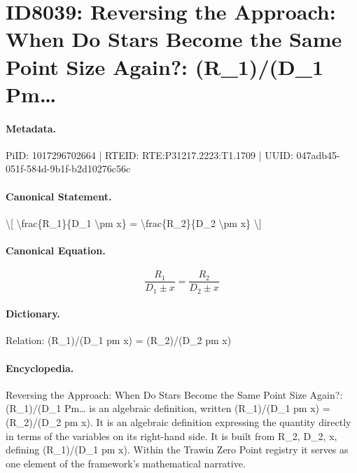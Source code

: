 \section*{ID8039: Reversing the Approach: When Do Stars Become the Same Point Size Again?: (R\_1)/(D\_1 Pm…}
\paragraph{Metadata.}
PiID: 1017296702664 | RTEID: RTE:P31217.2223:T1.1709 | UUID: 047adb45-051f-584d-9b1f-b2d10276c56c

\paragraph{Canonical Statement.}
\textbackslash{}[ \textbackslash{}frac\{R\_1\}\{D\_1 \textbackslash{}pm x\} = \textbackslash{}frac\{R\_2\}\{D\_2 \textbackslash{}pm x\} \textbackslash{}]

\paragraph{Canonical Equation.}
\[
\frac{R_1}{D_1 \pm x} = \frac{R_2}{D_2 \pm x}
\]

\paragraph{Dictionary.}
Relation: (R\_1)/(D\_1 pm x) = (R\_2)/(D\_2 pm x)

\paragraph{Encyclopedia.}
Reversing the Approach: When Do Stars Become the Same Point Size Again?: (R\_1)/(D\_1 Pm… is an algebraic definition, written (R\_1)/(D\_1 pm x) = (R\_2)/(D\_2 pm x). It is an algebraic definition expressing the quantity directly in terms of the variables on its right-hand side. It is built from R\_2, D\_2, x, defining (R\_1)/(D\_1 pm x). Within the Trawin Zero Point registry it serves as one element of the framework's mathematical narrative.
